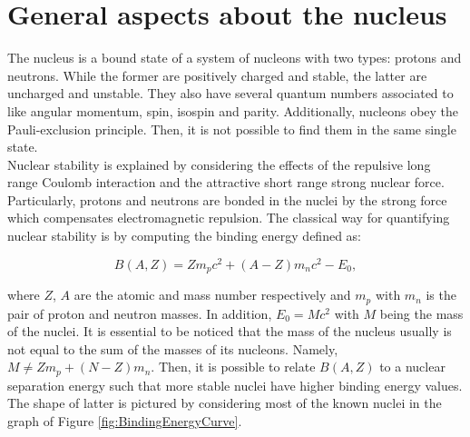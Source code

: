 \documentclass[openany]{book}
\begin{document}
\section{General aspects about the nucleus} \label{sec:nucleiAspects}

The nucleus is a bound state of a system of nucleons with two types: protons and neutrons. While the former are positively charged and stable, the latter are uncharged and unstable.  They also have several quantum numbers associated to like angular momentum, spin, isospin and parity. Additionally, nucleons obey the Pauli-exclusion principle. Then, it is not possible to find them in the same single state. \\

Nuclear stability is explained by considering the effects of the repulsive long range Coulomb interaction and the attractive short range strong nuclear force. Particularly, protons and neutrons are bonded in the nuclei by the strong force which compensates electromagnetic repulsion. The classical way for quantifying nuclear stability is by computing the binding energy defined as: 

\begin{equation} \label{eq:restEnergy}
	B(A, Z) = Zm_pc^2 + (A-Z)m_nc^2 - E_0,
\end{equation}

where $Z$, $A$ are the atomic and mass number respectively and $m_p$ with $m_n$ is the pair of proton and neutron masses. In addition, $E_0 = Mc^2$ with $M$ being the mass of the nuclei. It is essential to be noticed that the mass of the nucleus usually is not equal to the sum of the masses of its nucleons. Namely, $M \neq Zm_p + (N - Z)m_n$. Then, it is possible to relate $B(A, Z)$ to a nuclear separation energy such that more stable nuclei have higher binding energy values. The shape of latter is pictured by considering most of the known nuclei in the graph of Figure \ref{fig:BindingEnergyCurve}.

\end{document}

